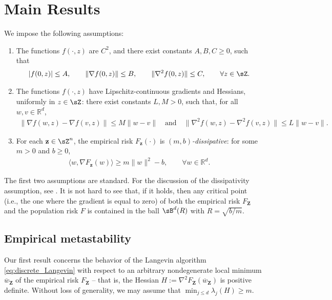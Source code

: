\documentclass[final,12pt]{colt2018}
\numberwithin{equation}{section}
\numberwithin{equation}{section}
\def\Reals{\mathbb{R}}
\def\deq{:=}
\def\bd#1{\mathbf{#1}}
\def\bz{\bd{z}}
\def\bZ{\bd{Z}}
\def\barw{\overline{w}}
\def\ave#1{\langle #1 \rangle}
\begin{document}
\section{Main Results}

We impose the following assumptions:
\begin{enumerate}[label={\bf (A.\arabic*)}]
	\item The functions $f(\cdot,z)$ are $C^2$, and there exist constants $A,B,C \ge 0$, such that
	\begin{align*}
		|f(0,z)| \le A, \qquad \| \nabla f(0,z) \| \le B, \qquad \| \nabla^2 f(0,z) \| \le C, \qquad \forall z \in \sZ.
		\end{align*}
    \item The functions $f(\cdot,z)$  have Lipschitz-continuous gradients and Hessians, uniformly in $z \in \sZ$: there exist constants $L,M > 0$, such that, for all $w,v \in \Reals^d$,
	\begin{align*}
	\|\nabla f(w,z)-\nabla f(v,z)\| \le M \| w - v\| \quad \text{and} \quad
	\|\nabla^2 f(w,z) - \nabla^2 f(v,z)\| \le L \|w - v \|.
\end{align*}
    \item For each $\bz \in \sZ^n$, the empirical risk $F_\bz(\cdot)$ is \textit{$(m,b)$-dissipative}: for some $m > 0$ and $b \ge 0$,
	\begin{align*}%
		\ave{w, \nabla F_\bz(w)} \ge m \| w \|^2 - b, \qquad \forall w \in \Reals^d.
	\end{align*}
\end{enumerate}
The first two assumptions are standard. For the discussion of the dissipativity assumption, see \cite*{rrt_colt17}. It is not hard to see that, if it holds, then any critical point (i.e., the one where the gradient is equal to zero) of both the empirical risk $F_\bZ$ and the population risk $F$ is contained in the ball $\sB^d(R)$ with $R = \sqrt{b/m}$.






\subsection{Empirical metastability}

Our first result concerns the behavior of the Langevin algorithm \eqref{eq:discrete_Langevin} with respect to an arbitrary nondegenerate local minimum $\barw_\bZ$ of the empirical risk $F_\bZ$ -- that is, the Hessian $H \deq \nabla^2 F_\bZ(\barw_\bZ)$ is positive definite. Without loss of generality, we may assume that $\min_{j \le d} \lambda_j(H) \ge m$.
\end{document}
